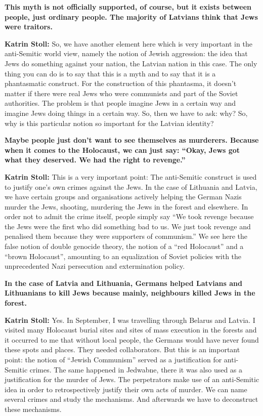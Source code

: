 \textbf{This myth is not officially supported, of course, but it exists between people, just ordinary people. The majority of Latvians think that Jews were traitors.} 

\textbf{Katrin Stoll:} So, we have another element here which is very important in the anti-Semitic world view, namely the notion of Jewish aggression: the idea that Jews do something against your nation, the Latvian nation in this case. The only thing you can do is to say that this is a myth and to say that it is a phantasmatic construct. For the construction of this phantasma, it doesn’t matter if there were real Jews who were communists and part of the Soviet authorities. The problem is that people imagine Jews in a certain way and imagine Jews doing things in a certain way. So, then we have to ask: why? So, why is this particular notion so important for the Latvian identity? 

\textbf{Maybe people just don’t want to see themselves as murderers. Because when it comes to the Holocaust, we can just say: ``Okay, Jews got what they deserved. We had the right to revenge.''} 

\textbf{Katrin Stoll:} This is a very important point: The anti-Semitic construct is used to justify one’s own crimes against the Jews. In the case of Lithuania and Latvia, we have certain groups and organisations actively helping the German Nazis murder the Jews, shooting, murdering the Jews in the forest and elsewhere. In order not to admit the crime itself, people simply say ``We took revenge because the Jews were the first who did something bad to us. We just took revenge and penalised them because they were supporters of communism.'' We see here the false notion of double genocide theory, the notion of a ``red Holocaust'' and a ``brown Holocaust'', amounting to an equalization of Soviet policies with the unprecedented Nazi persecution and extermination policy.  

\textbf{In the case of Latvia and Lithuania, Germans helped Latvians and Lithuanians to kill Jews because mainly, neighbours killed Jews in the forest.}

\textbf{Katrin Stoll:} Yes. In September, I was travelling through Belarus and Latvia. I visited many Holocaust burial sites and sites of mass execution in the forests and it occurred to me that without local people, the Germans would have never found these spots and places. They needed collaborators.  But this is an important point: the notion of ``Jewish Communism'' served as a justification for anti-Semitic crimes. The same happened in Jedwabne, there it was also used as a justification for the murder of Jews. The perpetrators make use of an anti-Semitic idea in order to retrospectively justify their own acts of murder. We can name several crimes and study the mechanisms. And afterwards we have to deconstruct these mechanisms. 

